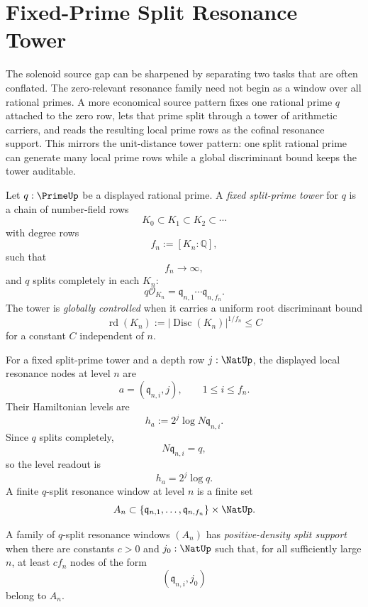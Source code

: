 \section{Fixed-Prime Split Resonance Tower}
\label{sec:unified-reality-fixed-prime-split-resonance-tower}

The solenoid source gap can be sharpened by separating two tasks that are
often conflated.  The zero-relevant resonance family need not begin as a
window over all rational primes.  A more economical source pattern fixes
one rational prime $q$ attached to the zero row, lets that prime split
through a tower of arithmetic carriers, and reads the resulting local
prime rows as the cofinal resonance support.  This mirrors the
unit-distance tower pattern: one split rational prime can generate many
local prime rows while a global discriminant bound keeps the tower
auditable.

\begin{definition}
\label{def:unified-reality-fixed-split-prime-tower}
Let $q:\PrimeUp$ be a displayed rational prime.  A \emph{fixed
split-prime tower} for $q$ is a chain of number-field rows
$$
K_0\subset K_1\subset K_2\subset\cdots
$$
with degree rows
$$
f_n:=[K_n:\mathbb Q],
$$
such that
$$
f_n\to\infty,
$$
and $q$ splits completely in each $K_n$:
$$
q\mathcal O_{K_n}
=
\mathfrak q_{n,1}\cdots \mathfrak q_{n,f_n}.
$$
The tower is \emph{globally controlled} when it carries a uniform root
discriminant bound
$$
\operatorname{rd}(K_n)
:=
|\operatorname{Disc}(K_n)|^{1/f_n}
\le C
$$
for a constant $C$ independent of $n$.
\end{definition}

\begin{definition}
\label{def:unified-reality-q-split-resonance-nodes}
For a fixed split-prime tower and a depth row $j:\NatUp$, the displayed
local resonance nodes at level $n$ are
$$
a=(\mathfrak q_{n,i},j),
\qquad
1\le i\le f_n.
$$
Their Hamiltonian levels are
$$
h_a:=2^j\log N\mathfrak q_{n,i}.
$$
Since $q$ splits completely,
$$
N\mathfrak q_{n,i}=q,
$$
so the level readout is
$$
h_a=2^j\log q.
$$
A finite $q$-split resonance window at level $n$ is a finite set
$$
A_n\subset
\{\mathfrak q_{n,1},\ldots,\mathfrak q_{n,f_n}\}\times\NatUp.
$$
\end{definition}

\begin{definition}
\label{def:unified-reality-positive-density-split-support}
A family of $q$-split resonance windows $(A_n)$ has
\emph{positive-density split support} when there are constants $c>0$ and
$j_0:\NatUp$ such that, for all sufficiently large $n$, at least
$c f_n$ nodes of the form
$$
(\mathfrak q_{n,i},j_0)
$$
belong to $A_n$.
\end{definition}

